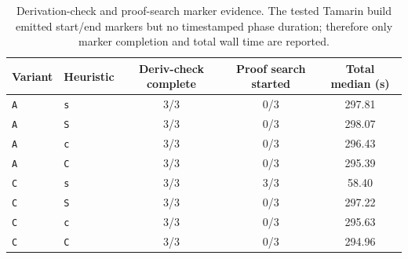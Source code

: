 \begin{table}[tb]
\centering
\caption{Derivation-check and proof-search marker evidence. The tested Tamarin build emitted start/end markers but no timestamped phase duration; therefore only marker completion and total wall time are reported.}
\label{tab:robustness-battery-r2-v3}
\scriptsize
\setlength{\tabcolsep}{4pt}
\begin{tabular}{@{}llccc@{}}
\hline
Variant & Heuristic & Deriv-check complete & Proof search started & Total median (s) \\
\hline
\texttt{A} & \texttt{s} & 3/3 & 0/3 & 297.81 \\
\texttt{A} & \texttt{S} & 3/3 & 0/3 & 298.07 \\
\texttt{A} & \texttt{c} & 3/3 & 0/3 & 296.43 \\
\texttt{A} & \texttt{C} & 3/3 & 0/3 & 295.39 \\
\texttt{C} & \texttt{s} & 3/3 & 3/3 & 58.40 \\
\texttt{C} & \texttt{S} & 3/3 & 0/3 & 297.22 \\
\texttt{C} & \texttt{c} & 3/3 & 0/3 & 295.63 \\
\texttt{C} & \texttt{C} & 3/3 & 0/3 & 294.96 \\
\hline
\end{tabular}
\end{table}
